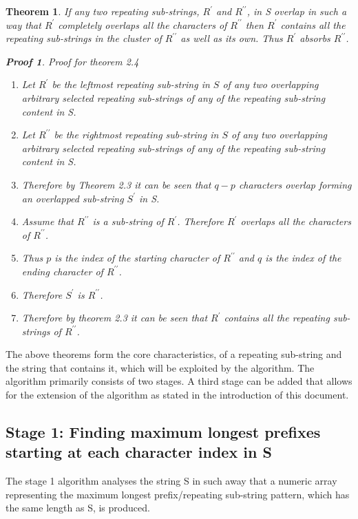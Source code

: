 \documentclass[12pt]{article}
\newtheorem{thm}{Theorem}[section]
\newtheorem{prf}{Proof}[section]
\begin{document}
\begin{flushleft}
	\begin{thm}
	If any two repeating sub-strings, $R^{\prime}$ and $R^{\prime\prime}$, in S overlap in such a way that $R^{\prime}$ completely overlaps all the characters of $R^{\prime\prime}$ then $R^{\prime}$ contains all the repeating sub-strings in the cluster of $R^{\prime\prime}$ as well as its own. Thus $R^{\prime}$ absorbs $R^{\prime\prime}$.
		\begin{prf} Proof for theorem 2.4
			\begin{enumerate}
			\item Let $R^{\prime}$ be the leftmost repeating sub-string in $S$ of any two overlapping arbitrary selected repeating sub-strings of any of the repeating sub-string content in S.  
			\item Let $R^{\prime\prime}$ be the rightmost repeating sub-string in $S$ of any two overlapping arbitrary selected repeating sub-strings of any of the repeating sub-string content in S.
			\item Therefore by Theorem 2.3 it can be seen that $q - p$ characters overlap forming an overlapped sub-string $S^{\prime}$ in S.
			\item Assume that $R^{\prime\prime}$ is a sub-string of $R^{\prime}$. Therefore  $R^{\prime}$ overlaps all the characters of $R^{\prime\prime}$.
			\item Thus $p$ is the index of the starting character of $R^{\prime\prime}$ and $q$ is the index of the ending character of $R^{\prime\prime}$.
			\item Therefore $S^{\prime}$ is $R^{\prime\prime}$.
			\item Therefore by theorem 2.3 it can be seen that $R^{\prime}$ contains all the repeating sub-strings of $R^{\prime\prime}$. 
			\end{enumerate}
		\end{prf} 
	\end{thm}
	
	The above theorems form the core characteristics, of a repeating sub-string and the string that contains it, which will be exploited by the algorithm. The algorithm primarily consists of two stages. A third stage can be added that allows for the extension of the algorithm as stated in the introduction of this document.
	\newpage
	\subsection{Stage 1: Finding maximum longest prefixes starting at each character index in S}
		The stage 1 algorithm analyses the string S in such away that a numeric array representing the maximum longest prefix/repeating sub-string pattern, which has the same length as S, is produced. 
	

\end{flushleft}
\end{document}
